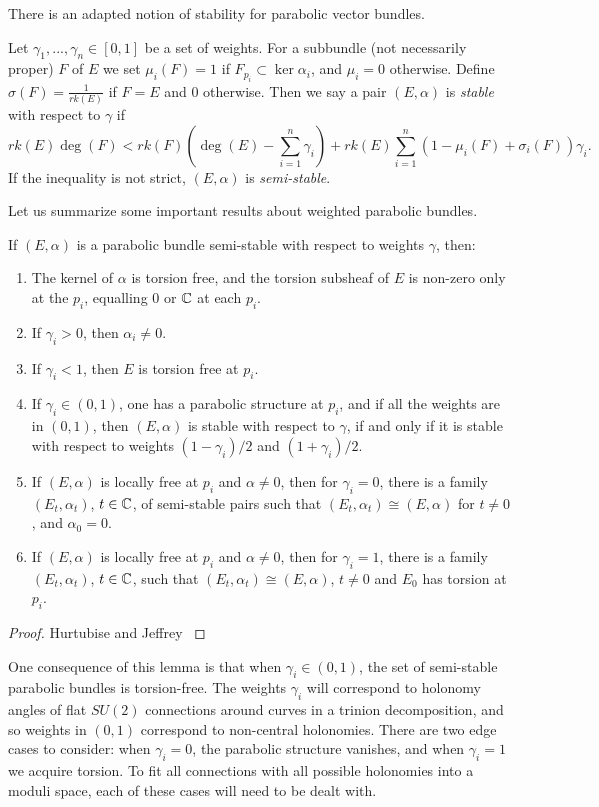 	There is an adapted notion of stability for parabolic vector bundles.
	\begin{definition}
		\label{d:para-stable}
		Let $\gamma_1,...,\gamma_n \in [0,1]$ be a set of weights. For a subbundle (not necessarily proper) $F$ of $E$ we set $\mu_i(F) = 1$ if $F_{p_i} \subset \ker\alpha_i$, and $\mu_i = 0$ otherwise. Define $\sigma(F) = \frac{1}{rk(E)}$ if $F=E$ and $0$ otherwise. Then we say a pair $(E,\alpha)$ is \emph{stable} with respect to $\gamma$ if 
		\begin{equation}
		rk(E)\deg(F) < rk(F)\left(\deg(E) - \sum_{i=1}^n \gamma_i\right) 
		+ rk(E)\sum_{i=1}^n(1 - \mu_i(F) + \sigma_i(F))\gamma_i.
		\end{equation}
		If the inequality is not strict, $(E,\alpha)$ is \emph{semi-stable}.
	\end{definition}
	 Let us summarize some important results about weighted parabolic bundles.
	\begin{lemma}
		\label{l:ss-lemma}
		If $(E,\alpha)$ is a parabolic bundle semi-stable with respect to weights $\gamma$, then:
		\begin{enumerate}
			\item The kernel of $\alpha$ is torsion free, and the torsion subsheaf of $E$ is non-zero only at the $p_i$, equalling $0$ or $\mathbb{C}$ at each $p_i$.
			\item If $\gamma_i >0$, then $\alpha_i \neq 0$.
			\item If $\gamma_i < 1$, then $E$ is torsion free at $p_i$.
			\item If $\gamma_i \in (0,1)$, one has a parabolic structure at $p_i$, and if all the weights are in $(0,1)$, then $(E,\alpha)$ is stable with respect to $\gamma$, if and only if it is stable with respect to weights $(1-\gamma_i)/2$ and $(1+\gamma_i)/2$.
			\item If $(E,\alpha)$ is locally free at $p_i$ and $\alpha \neq 0$, then for $\gamma_i = 0$, there is a family $(E_t, \alpha_t)$, $t\in \mathbb{C}$, of semi-stable pairs such that $(E_t,\alpha_t)\cong (E,\alpha)$ for $t\neq 0$, and $\alpha_0 = 0$. 
			\item If $(E,\alpha)$ is locally free at $p_i$ and $\alpha \neq 0$, then for $\gamma_i = 1$, there is a family $(E_t,\alpha_t)$, $t\in \mathbb{C}$, such that $(E_t, \alpha_t)\cong (E,\alpha)$, $t\neq 0$ and $E_0$ has torsion at $p_i$.
		\end{enumerate}
	\end{lemma}
	\begin{proof}
		Hurtubise and Jeffrey \cite[Lemma 4.3]{hurtubise_representations_2000}
	\end{proof}
	One consequence of this lemma is that when $\gamma_i\in (0,1)$, the set of semi-stable parabolic bundles is torsion-free. The weights $\gamma_i$ will correspond to holonomy angles of flat $SU(2)$ connections around curves in a trinion decomposition, and so weights in $(0,1)$ correspond to non-central holonomies. There are two edge cases to consider: when $\gamma_i = 0$, the parabolic structure vanishes, and when $\gamma_i = 1$ we acquire torsion. To fit all connections with all possible holonomies into a moduli space, each of these cases will need to be dealt with.
	
